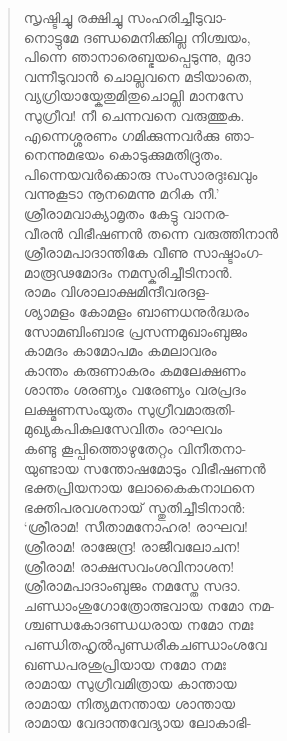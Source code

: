 \begin{verse}
സൃഷ്ടിച്ചു രക്ഷിച്ചു സംഹരിച്ചീടുവാ-\\
നൊട്ടുമേ ദണ്ഡമെനിക്കില്ല നിശ്ചയം,\\
പിന്നെ ഞാനാരെബ്ഭയപ്പെടുന്നു, മുദാ\\
വന്നീടുവാന്‍ ചൊല്ലവനെ മടിയാതെ,\\
വ്യഗ്രിയായ്കേതുമിതുചൊല്ലി മാനസേ\\
സുഗ്രീവ! നീ ചെന്നവനെ വരുത്തുക.\\
എന്നെശ്ശരണം ഗമിക്കുന്നവര്‍ക്കു ഞാ-\\
നെന്നുമഭയം കൊടുക്കുമതിദ്രുതം.\\
പിന്നെയവര്‍ക്കൊരു സംസാരദുഃഖവും\\
വന്നുകൂടാ നൂനമെന്നു മറിക നീ.’\\
ശ്രീരാമവാക്യാമൃതം കേട്ടു വാനര-\\
വീരന്‍ വിഭീഷണന്‍ തന്നെ വരുത്തിനാന്‍\\
ശ്രീരാമപാദാന്തികേ വീണു സാഷ്ടാംഗ-\\
മാരൂഢമോദം നമസ്കരിച്ചീടിനാന്‍.\\
രാമം വിശാലാക്ഷമിന്ദീവരദള-\\
ശ്യാമളം കോമളം ബാണധനുര്‍ദ്ധരം\\
സോമബിംബാഭ പ്രസന്നമുഖാംബുജം\\
കാമദം കാമോപമം കമലാവരം\\
കാന്തം കരുണാകരം കമലേക്ഷണം\\
ശാന്തം ശരണ്യം വരേണ്യം വരപ്രദം\\
ലക്ഷ്മണസംയുതം സുഗ്രീവമാരുതി-\\
മുഖ്യകപികുലസേവിതം രാഘവം\\
കണ്ടു കൂപ്പിത്തൊഴുതേറ്റം വിനീതനാ-\\
യുണ്ടായ സന്തോഷമോടും വിഭീഷണന്‍\\
ഭക്തപ്രിയനായ ലോകൈകനാഥനെ\\
ഭക്തിപരവശനായ് സ്തുതിച്ചീടിനാന്‍:\\
‘ശ്രീരാമ! സീതാമനോഹര! രാഘവ!\\
ശ്രീരാമ! രാജേന്ദ്ര! രാജീവലോചന!\\
ശ്രീരാമ! രാക്ഷസവംശവിനാശന!\\
ശ്രീരാമപാദാംബുജം നമസ്തേ സദാ.\\
ചണ്ഡാംശുഗോത്രോത്ഭവായ നമോ നമ-\\
ശ്ചണ്ഡകോദണ്ഡധരായ നമോ നമഃ\\
പണ്ഡിതഹൃല്‍പുണ്ഡരീകചണ്ഡാംശവേ\\
ഖണ്ഡപരശുപ്രിയായ നമോ നമഃ\\
രാമായ സുഗ്രീവമിത്രായ കാന്തായ\\
രാമായ നിത്യമനന്തായ ശാന്തായ\\
രാമായ വേദാന്തവേദ്യായ ലോകാഭി-\\

\end{verse}
